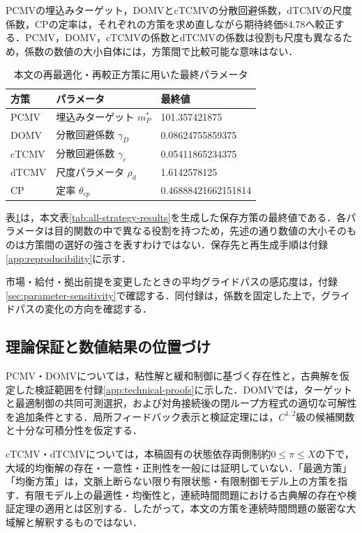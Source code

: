 \documentclass[10pt,a4paper]{article}
\theoremstyle{plain}
\theoremstyle{definition}
\begin{document}
PCMVの埋込みターゲット，DOMVとcTCMVの分散回避係数，dTCMVの尺度係数，CPの定率は，それぞれの方策を求め直しながら期待終価84.78へ較正する．PCMV，DOMV，cTCMVの係数とdTCMVの係数は役割も尺度も異なるため，係数の数値の大小自体には，方策間で比較可能な意味はない．

\begin{table}[htbp]
\centering\small
\caption{本文の再最適化・再較正方策に用いた最終パラメータ}
\label{tab:final-calibration-parameters}
\begin{tabular}{lll}
\toprule
方策 & パラメータ & 最終値 \\
\midrule
PCMV & 埋込みターゲット $m_P^*$ & 101.357421875 \\
DOMV & 分散回避係数 $\gamma_D$ & 0.08624755859375 \\
cTCMV & 分散回避係数 $\gamma_c$ & 0.05411865234375 \\
dTCMV & 尺度パラメータ $\rho_d$ & 1.6142578125 \\
CP & 定率 $\theta_{cp}$ & 0.46888421662151814 \\
\bottomrule
\end{tabular}
\end{table}

表\ref{tab:final-calibration-parameters}は，本文表\ref{tab:all-strategy-results}を生成した保存方策の最終値である．各パラメータは目的関数の中で異なる役割を持つため，先述の通り数値の大小そのものは方策間の選好の強さを表すわけではない．保存先と再生成手順は付録\ref{app:reproducibility}に示す．

市場・給付・拠出前提を変更したときの平均グライドパスの感応度は，付録\ref{sec:parameter-sensitivity}で確認する．同付録は，係数を固定した上で，グライドパスの変化の方向を確認する．

\subsection{理論保証と数値結果の位置づけ}\label{sec:method-scope}
PCMV・DOMVについては，粘性解と緩和制御に基づく存在性と，古典解を仮定した検証範囲を付録\ref{app:technical-proofs}に示した．DOMVでは，ターゲットと最適制御の共同可測選択，および対角接続後の閉ループ方程式の適切な可解性を追加条件とする．局所フィードバック表示と検証定理には，$C^{1,2}$級の候補関数と十分な可積分性を仮定する．

cTCMV・dTCMVについては，本稿固有の状態依存両側制約$0\leq\pi\leq X$の下で，大域的均衡解の存在・一意性・正則性を一般には証明していない．「最適方策」「均衡方策」は，文脈上断らない限り有限状態・有限制御モデル上の方策を指す．有限モデル上の最適性・均衡性と，連続時間問題における古典解の存在や検証定理の適用とは区別する．したがって，本文の方策を連続時間問題の厳密な大域解と解釈するものではない．
\end{document}

